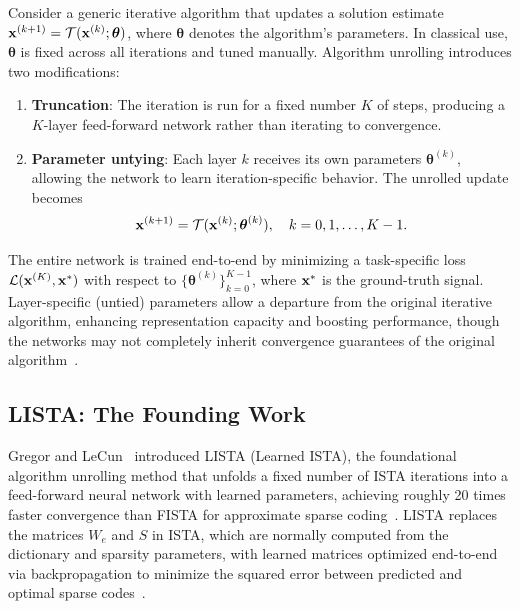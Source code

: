Consider a generic iterative algorithm that updates a solution estimate $\mathbf{x}^{(k+1)} = \mathcal{T}(\mathbf{x}^{(k)}; \boldsymbol{\theta})$, where $\boldsymbol{\theta}$ denotes the algorithm's parameters. In classical use, $\boldsymbol{\theta}$ is fixed across all iterations and tuned manually. Algorithm unrolling introduces two modifications:

\begin{enumerate}
    \item \textbf{Truncation}: The iteration is run for a fixed number $K$ of steps, producing a $K$-layer feed-forward network rather than iterating to convergence.
    \item \textbf{Parameter untying}: Each layer $k$ receives its own parameters $\boldsymbol{\theta}^{(k)}$, allowing the network to learn iteration-specific behavior. The unrolled update becomes
    \begin{equation}
        \mathbf{x}^{(k+1)} = \mathcal{T}(\mathbf{x}^{(k)}; \boldsymbol{\theta}^{(k)}), \quad k = 0, 1, \ldots, K-1.
        \label{eq:unrolled_update}
    \end{equation}
\end{enumerate}

The entire network is trained end-to-end by minimizing a task-specific loss $\mathcal{L}(\mathbf{x}^{(K)}, \mathbf{x}^*)$ with respect to $\{\boldsymbol{\theta}^{(k)}\}_{k=0}^{K-1}$, where $\mathbf{x}^*$ is the ground-truth signal. Layer-specific (untied) parameters allow a departure from the original iterative algorithm, enhancing representation capacity and boosting performance, though the networks may not completely inherit convergence guarantees of the original algorithm~\cite{monga2021unrolling}.

\subsection{LISTA: The Founding Work}

Gregor and LeCun~\cite{gregor2010lista} introduced LISTA (Learned ISTA), the foundational algorithm unrolling method that unfolds a fixed number of ISTA iterations into a feed-forward neural network with learned parameters, achieving roughly 20 times faster convergence than FISTA for approximate sparse coding~\cite{gregor2010lista}. LISTA replaces the matrices $W_e$ and $S$ in ISTA, which are normally computed from the dictionary and sparsity parameters, with learned matrices optimized end-to-end via backpropagation to minimize the squared error between predicted and optimal sparse codes~\cite{gregor2010lista}.

